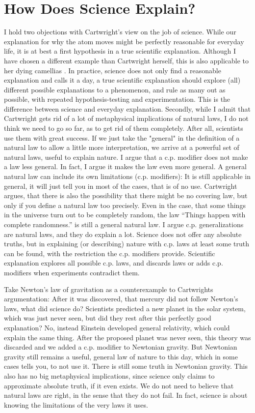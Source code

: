 \section*{How Does Science Explain?}
I hold two objections with Cartwright's view on
the job of science.
While our explanation for why the atom moves might be
perfectly reasonable for everyday life, it is at best
a first hypothesis in a true scientific explanation.
Although I have chosen a different example than Cartwright herself,
this is also applicable to her dying camellias \cite[6]{cartwright1980truth}.
In practice, science does not only find a reasonable explanation and calls it a day,
a true scientific explanation should explore (all) different
possible explanations to a phenomenon, and rule
as many out as possible, with repeated hypothesis-testing
and experimentation. This is the difference between science and everyday explanation.
Secondly, while I admit that Cartwright gets rid of a lot of metaphysical implications
of natural laws, I do not think we need to go so far, as to get rid of them
completely. After all, scientists use them with great success.
If we just take the "general" in the definition of a natural law to allow
a little more interpretation, we arrive at a powerful set of natural laws,
useful to explain nature.
I argue that a c.p. modifier does not make a law less general. In fact, I argue
it makes the law even more general. A general natural law can include its own
limitations (c.p. modifiers): It is still applicable in general, it will
just tell you in most of the cases, that is of no use.
Cartwright argues, that there is also the possibility that
there might be no covering law, but only if you
define a natural law too precisely.
Even in the case, that some things in the universe turn out to be
completely random, the law \enquote{Things happen with complete randomness.}
is still a general natural law.
I argue c.p. generalizations are natural laws, and they do explain a lot.
Science does not offer any absolute truths, but
in explaining (or describing) nature with c.p. laws at least
some truth can be found, with the restriction the c.p. modifiers provide.
Scientific explanation explores all possible c.p. laws,
and discards laws or adds c.p. modifiers when experiments contradict them.

Take Newton's law of gravitation as a counterexample to Cartwrights argumentation:
After it was discovered, that mercury did not follow Newton's laws, what did
science do?
Scientists predicted a new planet in the solar system, which was just never seen, but
did they rest after this perfectly good explanation?
No, instead Einstein developed general relativity, which could explain the same thing.
After the proposed planet was never seen, this theory was discarded and
we added a c.p. modifier to Newtonian gravity.
But Newtonian gravity still remains a useful, general law of nature to this day,
which in some cases tells you, to not use it.
There is still some truth in Newtonian gravity.
This also has no big metaphysical implications, since science only
claims to approximate absolute truth, if it even exists.
We do not need to believe that natural laws are right, in the sense that
they do not fail. In fact, science is about knowing the limitations of the
very laws it uses.



